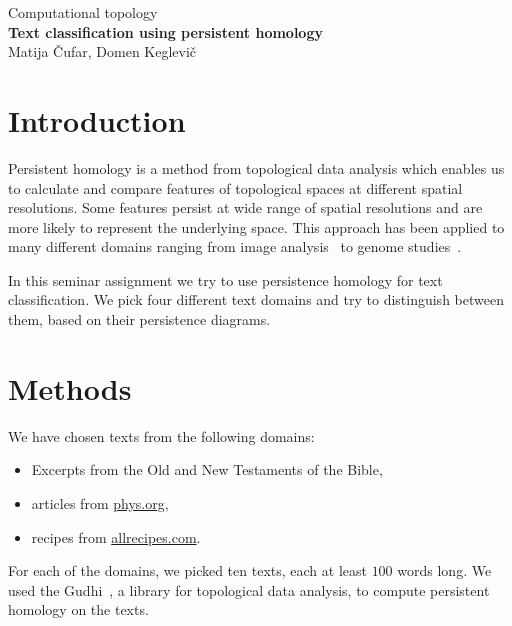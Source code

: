 \documentclass[12pt,a4paper]{amsart}
\begin{document}
\thispagestyle{empty}
\begin{center}{\large
Computational topology\\[4mm]
{\bf Text classification using persistent homology}\\[4mm]
Matija Čufar, Domen Keglevič\\[6mm]
}
\end{center}
\bigskip

\section{Introduction}
Persistent homology is a method from topological data analysis which enables us
to calculate and compare features of topological spaces at different spatial
resolutions. Some features persist at wide range of spatial resolutions and are
more likely to represent the underlying space. This approach has been applied to
many different domains ranging from image analysis~\cite{nakane2015homology} to
genome studies~\cite{camara2016topological}.

In this seminar assignment we try to use persistence homology for text
classification. We pick four different text domains and try to distinguish
between them, based on their persistence diagrams.

\section{Methods}

We have chosen texts from the following domains:

\begin{itemize}
  \setlength\itemsep{0.5em}
\item Excerpts from the Old and New Testaments of the Bible,
\item articles from \url{phys.org},
\item recipes from \url{allrecipes.com}.
\end{itemize}

For each of the domains, we picked ten texts, each at least $100$ words long. We
used the Gudhi~\cite{maria2014gudhi}, a library for topological data analysis,
to compute persistent homology on the texts.
\end{document}
